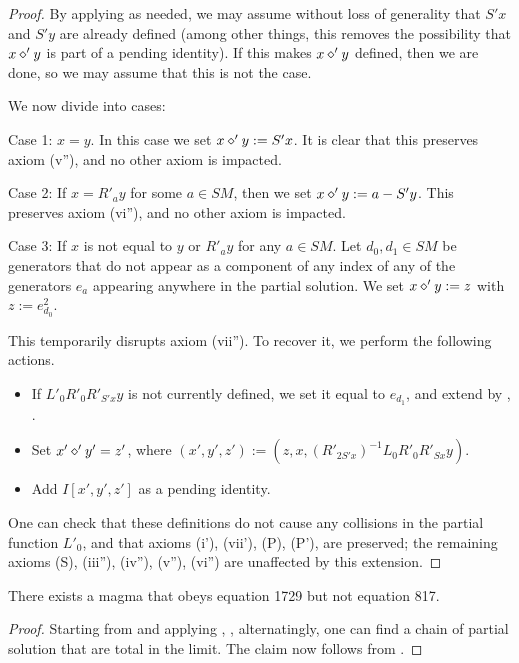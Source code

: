 \begin{proof}\leanok  By applying  as needed, we may assume without loss of generality that $S'x$ and $S'y$ are already defined (among other things, this removes the possibility that $x \diamond' y$ is part of a pending identity).  If this makes $x \diamond' y$ defined, then we are done, so we may assume that this is not the case.

We now divide into cases:

Case 1: $x=y$.  In this case we set $x \diamond' y := S'x$.  It is clear that this preserves axiom (v''), and no other axiom is impacted.

Case 2: If $x = R'_a y$ for some $a \in SM$, then we set $x \diamond' y := a - S'y$.  This preserves axiom (vi''), and no other axiom is impacted.

Case 3: If $x$ is not equal to $y$ or $R'_a y$ for any $a \in SM$.  Let $d_0, d_1 \in SM$ be generators that do not appear as a component of any index of any of the generators $e_a$ appearing anywhere in the partial solution.  We set $x \diamond' y := z$ with $z := e^2_{d_0}$.

This temporarily disrupts axiom (vii'').  To recover it, we perform the following actions.
\begin{itemize}
  \item If $L'_0 R'_0 R'_{S'x} y$ is not currently defined, we set it equal to $e_{d_1}$, and extend by , .
  \item Set $x' \diamond' y' = z'$, where $(x',y',z') := (z, x, (R'_{2S'x})^{-1} L_0 R'_0 R'_{Sx} y)$.
  \item Add $I[x',y',z']$ as a pending identity.
\end{itemize}

One can check that these definitions do not cause any collisions in the partial function $L'_0$, and that axioms (i'), (vii'), (P), (P'), are preserved; the remaining axioms (S), (iii''), (iv''), (v''), (vi'') are unaffected by this extension.
\end{proof}


\begin{theorem}\label{1729_refute_817}\leanok There exists a magma that obeys equation 1729 but not equation 817.
\end{theorem}

\begin{proof}\leanok
  Starting from  and applying , ,  alternatingly, one can find a chain of partial solution that are total in the limit.  The claim now follows from .
\end{proof}
